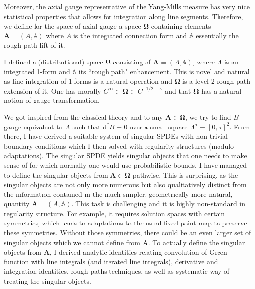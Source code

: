 \documentclass[12pt]{article}
\numberwithin{equation}{section}
\theoremstyle{definition}
\theoremstyle{remark}
\newcommand{\diff}{\mathrm{d}}
\newcommand{\1}{\mathbf 1}
\newcommand{\<}{\langle}
\renewcommand{\>}{\rangle}
\newcommand{\bfA}{\mathbf A}
\newcommand{\bA}{\mathbb A}
\newcommand{\bfOmega}{\boldsymbol{\Omega}}
\begin{document}
Moreover, the axial gauge representative of the Yang-Mills measure has very nice statistical properties that allows for integration along line segments. Therefore, we define for the space of axial gauge a space $\bfOmega$ containing elements $\bfA=(A,\bA)$ where $A$ is the integrated connection form and $\bA$ essentially the rough path lift of it. 


I defined a (distributional) space $\bfOmega$ consisting of $\bfA=(A,\bA)$, where $A$ is an integrated 1-form and  $\bA$ its ``rough path" enhancement. 
%
%
This is novel and natural as line integration of 1-forms is a natural operation and $\bfOmega$ is a level-2 rough path extension of it. 
%
One has morally $C^\infty\subset \bfOmega\subset C^{-1/2-\kappa}$ and that $\bfOmega$ has a natural notion of gauge transformation. 

We got inspired from the classical theory and to any $\bfA\in\bfOmega$,  we try to find $B$ gauge equivalent to $A$ such that $\diff^*B=0$ over a small square $\Lambda^\sigma=[0,\sigma]^2$. From there, I have derived a suitable system of singular SPDEs with non-trivial boundary conditions which I then solved with regularity structures (modulo adaptations). 
%
%
The singular SPDE yields singular objects 
that one needs to make sense of for which normally one would use probabilistic bounds. I have managed to define the singular objects from $\bfA\in\bfOmega$ pathwise. This is surprising, as the singular objects are not only more numerous but also qualitatively distinct from the information contained in the much simpler, geometrically more natural, quantity $\bfA=(A,\bA)$.  This task is challenging and it is highly non-standard in regularity structure. For example, it requires solution spaces  with certain symmetries, which leads to adaptations to the usual fixed point map to preserve these symmetries. Without those symmetries, there could be an even larger set of singular objects which we cannot define from $\bfA$. 
%
To actually define the singular objects from $\bfA$, I derived analytic identities relating convolution of Green function with line integrals (and iterated line integrals), derivative and integration identities, rough paths techniques, as well as systematic way of treating the singular objects. 
\end{document}
